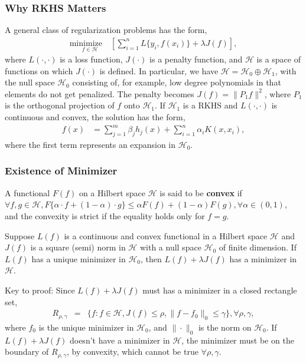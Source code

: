 \documentclass{beamer}
\def\cal{\mathcal}
\def\minimize{\mathrm{minimize}\quad }
\begin{document}
\begin{frame}
	\frametitle{Why RKHS Matters}
	A general class of regularization problems has the form,
	\begin{eqnarray*}
		\underset{f \in {\cal H}} {\minimize}  \left[\sum_{i=1}^n L\{y_i, f(x_i)\} + \lambda J(f) \right],
	\end{eqnarray*}
	where $L(\cdot, \cdot)$ is a loss function, $J(\cdot)$ is a penalty function, and ${\cal H}$ is a space of functions on which $J(\cdot)$ is defined. In particular, we have ${\cal H} = {\cal H}_0\oplus{\cal H}_1$, with the null space ${\cal H}_0$ consisting of, for example, low degree polynomials in that elements do not get penalized. The penalty becomes $J(f)=\|P_1f\|^2$, where $P_1$ is the orthogonal projection of $f$ onto ${\cal H}_1$. If ${\cal H}_1$ is a RKHS and $L(\cdot, \cdot)$ is continuous and convex, the solution has the form,
	\begin{align*}
		f(x) &= \sum_{j=1}^m \beta_j h_j(x) + \sum_{i=1}^n \alpha_i K(x,x_i),
	\end{align*}
	where the first term represents an expansion in ${\cal H}_0$.
\end{frame}

\begin{frame}
	\frametitle{Existence of Minimizer}
	A functional $F(f)$ on a Hilbert space ${\cal H}$ is said to be \textbf{convex} if $\forall f,g \in {\cal H}, F\{\alpha\cdot f +(1-\alpha)\cdot g\} \le \alpha F(f)+(1-\alpha)F(g), \forall \alpha \in (0,1)$, and the convexity is strict if the equality holds only for $f=g$.
	
	\begin{theorem}[Existence]
		Suppose $L(f)$ is a continuous and convex functional in a Hilbert space ${\cal H}$ and $J(f)$ is a square (semi) norm in ${\cal H}$ with a null space ${\cal H}_0$ of finite dimension. If $L(f)$ has a unique minimizer in ${\cal H}_0$, then $L(f)+\lambda J(f)$ has a minimizer in ${\cal H}$.
	\end{theorem}
	Key to proof: Since $L(f)+\lambda J(f)$ must has a minimizer in a closed rectangle set,
	\begin{eqnarray*}
		R_{\rho,\gamma} &=& \{f: f \in {\cal H}, J(f) \le \rho, \|f-f_0\|_0 \le \gamma \},  \forall \rho, \gamma, 
	\end{eqnarray*}
	where $f_0$ is the unique minimizer in ${\cal H}_0$, and $\|\cdot\|_0$ is the norm on ${\cal H}_0$. If $L(f)+\lambda J(f)$ doesn't have a minimizer in ${\cal H}$, the minimizer must be on the boundary of $R_{\rho,\gamma}$, by convexity,  which cannot be true $\forall \rho, \gamma$.
\end{frame}
\end{document}
